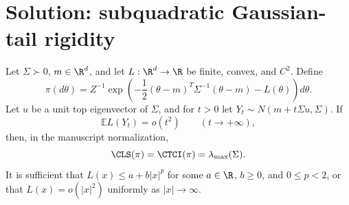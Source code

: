 \documentclass[../main.tex]{subfiles}
\begin{document}

\section*{Solution: subquadratic Gaussian-tail rigidity}
\label{sec:sol-a2-subquadratic-tail}

\begin{theorem}
\label{thm:sol-a2-subquadratic}
Let $\Sigma\succ0$, $m\in\R^d$, and let $L:\R^d\to\R$ be finite, convex, and $C^2$.  Define
\[
 \pi(d\theta)=Z^{-1}\exp\!\left(
  -\frac12(\theta-m)^T\Sigma^{-1}(\theta-m)-L(\theta)
 \right)d\theta.
\]
Let $u$ be a unit top eigenvector of $\Sigma$, and for $t>0$ let
$Y_t\sim N(m+t\Sigma u,\Sigma)$.  If
\[
 \mathbb E L(Y_t)=o(t^2)\qquad(t\to+\infty),
\]
then, in the manuscript normalization,
\[
 \CLS(\pi)=\CTCI(\pi)=\lambda_{\max}(\Sigma).
\]
It is sufficient that $L(x)\le a+b|x|^p$ for some $a\in\R$, $b\ge0$, and $0\le p<2$, or that
$L(x)=o(|x|^2)$ uniformly as $|x|\to\infty$.
\end{theorem}
\end{document}
